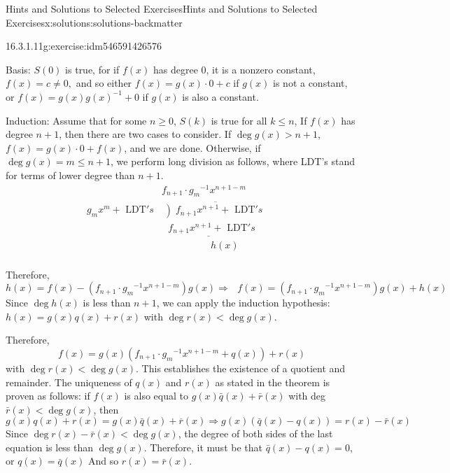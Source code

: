 \documentclass[oneside,10pt,]{book}
\numberwithin{equation}{section}
\begin{document}
\begin{solutions-chapter}{Hints and Solutions to Selected Exercises}{}{Hints and Solutions to Selected Exercises}{}{}{x:solutions:solutions-backmatter}
\begin{divisionsolution}{16.3.1.11}{}{g:exercise:idm546591426576}
\par
Basis: \(S(0)\) is true, for if \(f(x)\)  has degree 0, it is a nonzero constant, \(f(x)=c\neq 0,\) and so either \(f(x) =g(x)\cdot 0 + c\)  if \(g(x)\) is not a constant, or \(f(x) = g(x)g(x)^{-1}+0\) if \(g(x)\) is also a constant.%
\par
Induction: Assume that for some \(n\geq 0\), \(S(k)\) is true for all \(k \leq  n\), If \(f(x)\) has degree \(n+1\), then there are two cases to consider. If \(\deg  g(x) > n + 1\), \(f(x) = g(x)\cdot 0 + f(x)\), and we are done. Otherwise, if \(\deg  g(x) =m \leq  n + 1\), we perform long division as follows, where LDT's stand for terms of lower degree than \(n+1\).%
\begin{equation*}
\begin{array}{rll}
& f_{n+1}\cdot g_m{}^{-1}x^{n+1-m} \\
g_mx^m+ \textrm{ LDT}'s & \overline{\left) f_{n+1}x^{n+1}\right.+ \textrm{ LDT}'s 
\textrm{                     }}& \\ & \underline{\textrm{    }f_{n+1}x^{n+1}+ \textrm{ LDT}'s}\textrm{ 
}\\& \quad\quad\quad\quad\quad h(x) \\
\end{array}
\end{equation*}
%
\par
Therefore,%
\begin{equation*}
h(x) = f(x)-\left(f_{n+1}\cdot g_m{}^{-1}x^{n+1-m}\right) g(x) \Rightarrow \textrm{   }f(x) = \left(f_{n+1}\cdot g_m{}^{-1}x^{n+1-m}\right)
g(x)+h(x) 
\end{equation*}
Since \(\deg  h(x)\) is less than \(n+1\), we can apply the induction hypothesis: \(h(x) = g(x)q(x) + r(x)\) with  \(\deg  r(x) < \deg  g(x)\).%
\par
Therefore,%
\begin{equation*}
f(x) = g(x)\left(f_{n+1}\cdot g_m{}^{-1}x^{n+1-m}+ q(x)\right) + r(x)
\end{equation*}
with  \(\deg  r(x) < \deg  g(x)\).  This establishes the existence of a quotient and remainder. The uniqueness of \(q(x)\) and \(r(x)\) as stated in the theorem is proven as follows: if \(f(x)\) is also equal to \(g(x)\bar{q}(x) + \bar{r}(x)\) with deg \(\bar{r}(x) < \deg  g(x)\), then%
\begin{equation*}
g(x)q(x) + r(x) = g(x) \bar{q}(x) +\overline{ r}(x) \Rightarrow  g(x) \left(\bar{q}(x)-q(x)\right)= r(x)-\bar{r}(x)
\end{equation*}
Since \(\deg  r(x) - \bar{r}(x) < \deg  g(x)\), the degree of both sides of the last equation is less than \(\deg  g(x)\). Therefore, it must be that \(\bar{q}(x) - q(x) = 0\), or \(q(x) =\bar{q}(x)\) And so \(r(x) = \bar{r}(x)\).%

\end{divisionsolution}
\end{solutions-chapter}
\end{document}
